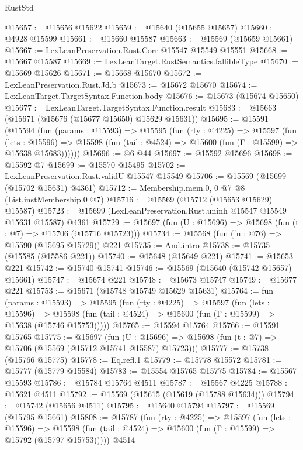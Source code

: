 \begin{lexlean}{RustStd}
\begin{coremodule}
@15657 := @15656 @15622
@15659 := @15640 (@15655 @15657)
@15660 := @4928 @15599
@15661 := @15660 @15587
@15663 := @15569 (@15659 @15661)
@15667 := LexLeanPreservation.Rust.Corr @15547 @15549 @15551
@15668 := @15667 @15587
@15669 := LexLeanTarget.RustSemantics.fallibleType
@15670 := @15669 @15626
@15671 := @15668 @15670
@15672 := LexLeanPreservation.Rust.Jd.b
@15673 := @15672 @15670
@15674 := LexLeanTarget.TargetSyntax.Function.body
@15676 := @15673 (@15674 @15650)
@15677 := LexLeanTarget.TargetSyntax.Function.result
@15683 := @15663 (@15671 (@15676 (@15677 @15650) @15629 @15631))
@15695 := @15591
    (@15594
      (fun (params : @15593) =>
      @15595
        (fun (rty : @4225) =>
        @15597
          (fun (lets : @15596) =>
          @15598 (fun (tail : @4524) => @15600 (fun (Γ : @15599) => @15638 @15683))))))
@15696 := @6 @44
@15697 := @15592 @15696
@15698 := @15592 @7
@15699 := @15570 @15495
@15702 := LexLeanPreservation.Rust.validU @15547 @15549
@15706 := @15569 (@15699 (@15702 @15631) @4361)
@15712 := Membership.mem.{0, 0} @7 @8 (List.instMembership.{0} @7)
@15716 := @15569 (@15712 (@15653 @15629) @15587)
@15723 := @15699 (LexLeanPreservation.Rust.uninh @15547 @15549 @15631 @15587) @4361
@15729 := @15697 (fun (U : @15696) => @15698 (fun (t : @7) => @15706 (@15716 @15723)))
@15734 := @15568 (fun (fn : @76) => @15590 (@15695 @15729)) @221
@15735 := And.intro
@15738 := @15735 (@15585 (@15586 @221))
@15740 := @15648 (@15649 @221)
@15741 := @15653 @221
@15742 := @15740 @15741
@15746 := @15569 (@15640 (@15742 @15657) @15661)
@15747 := @15674 @221
@15748 := @15673 @15747
@15749 := @15677 @221
@15753 := @15671 (@15748 @15749 @15629 @15631)
@15764 := fun (params : @15593) =>
  @15595
    (fun (rty : @4225) =>
    @15597
      (fun (lets : @15596) =>
      @15598 (fun (tail : @4524) => @15600 (fun (Γ : @15599) => @15638 (@15746 @15753)))))
@15765 := @15594 @15764
@15766 := @15591 @15765
@15775 := @15697
    (fun (U : @15696) => @15698 (fun (t : @7) => @15706 (@15569 (@15712 @15741 @15587) @15723)))
@15777 := @15738 (@15766 @15775)
@15778 := Eq.refl.{1}
@15779 := @15778 @15572
@15781 := @15777 (@15779 @15584)
@15783 := @15554 @15765 @15775
@15784 := @15567 @15593
@15786 := @15784 @15764 @4511
@15787 := @15567 @4225
@15788 := @15621 @4511
@15792 := @15569 (@15615 (@15619 (@15788 @15634)))
@15794 := @15742 (@15656 @4511)
@15795 := @15640 @15794
@15797 := @15569 (@15795 @15661)
@15808 := @15787
    (fun (rty : @4225) =>
    @15597
      (fun (lets : @15596) =>
      @15598 (fun (tail : @4524) => @15600 (fun (Γ : @15599) => @15792 (@15797 @15753)))))
    @4514

\end{coremodule}
\end{lexlean}
